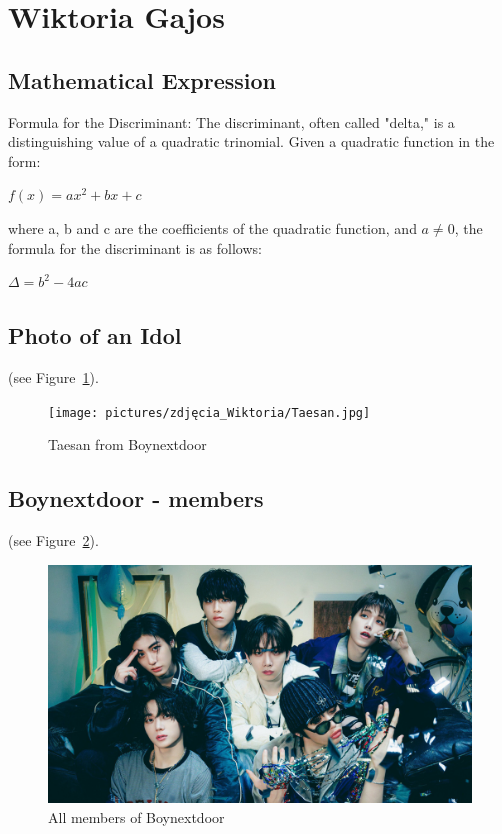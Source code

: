 
\setlength{\parskip}{10pt}

\section{Wiktoria Gajos}
\label{sec:wiktoriagajos}

\setlength{\parskip}{10pt}
\subsection{Mathematical Expression}

Formula for the Discriminant:
\flushleft
The discriminant, often called "delta," is a distinguishing value of a quadratic trinomial.
Given a quadratic function in the form:

$f(x) = ax^2 + bx + c$

where a, b and c are the coefficients of the quadratic function, and $a \ne 0$,
the formula for the discriminant is as follows:

$\Delta = b^2 - 4ac$

\subsection{Photo of an Idol}
(see Figure~\ref{fig:Taesan}).

\begin{figure}[h]
\centering
    \texttt{[image: pictures/zdjęcia\_Wiktoria/Taesan.jpg]}
    \caption{Taesan from Boynextdoor}
    \label{fig:Taesan}
\end{figure}

\newpage
\subsection{Boynextdoor - members}
(see Figure~\ref{fig:BND}).

\begin{figure}[h]
    \centering
    \includegraphics[width=\linewidth]{pictures/zdjęcia_Wiktoria/BND_all.jpg}
    \caption{All members of Boynextdoor}
    \label{fig:BND}
\end{figure}


